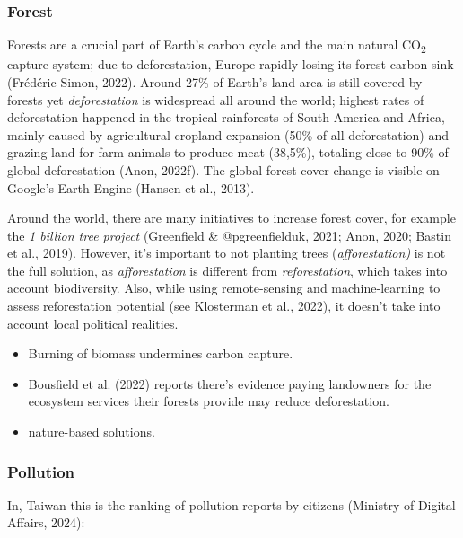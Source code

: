 \documentclass[
  letterpaper,
  DIV=11,
  numbers=noendperiod]{scrartcl}
\providecommand{\tightlist}{%
  \setlength{\itemsep}{0pt}\setlength{\parskip}{0pt}}\usepackage{longtable,booktabs,array}
\begin{document}
\subsubsection{Forest}\label{forest}

Forests are a crucial part of Earth's carbon cycle and the main natural
CO\textsubscript{2} capture system; due to deforestation, Europe rapidly
losing its forest carbon sink (Frédéric Simon, 2022). Around 27\% of
Earth's land area is still covered by forests yet \emph{deforestation}
is widespread all around the world; highest rates of deforestation
happened in the tropical rainforests of South America and Africa, mainly
caused by agricultural cropland expansion (50\% of all deforestation)
and grazing land for farm animals to produce meat (38,5\%), totaling
close to 90\% of global deforestation (Anon, 2022f). The global forest
cover change is visible on Google's Earth Engine (Hansen et al., 2013).

Around the world, there are many initiatives to increase forest cover,
for example the \emph{1 billion tree project} (Greenfield \&
@pgreenfielduk, 2021; Anon, 2020; Bastin et al., 2019). However, it's
important to not planting trees (\emph{afforestation)} is not the full
solution, as \emph{afforestation} is different from
\emph{reforestation}, which takes into account biodiversity. Also, while
using remote-sensing and machine-learning to assess reforestation
potential (see Klosterman et al., 2022), it doesn't take into account
local political realities.

\begin{itemize}
\tightlist
\item
  Burning of biomass undermines carbon capture.
\item
  Bousfield et al. (2022) reports there's evidence paying landowners for
  the ecosystem services their forests provide may reduce deforestation.
\item
  nature-based solutions.
\end{itemize}

\subsubsection{Pollution}\label{pollution}

In, Taiwan this is the ranking of pollution reports by citizens
(Ministry of Digital Affairs, 2024):
\end{document}
